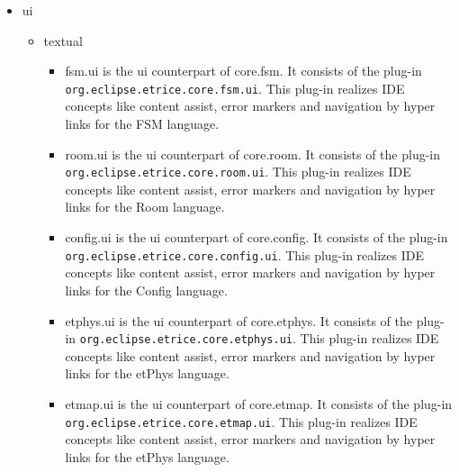 \begin{itemize}
\item ui
\begin{itemize}
\item textual
\begin{itemize}

\item fsm.ui is the ui counterpart of core.fsm.  It consists of the plug-in 
\texttt{org.eclipse.etrice.core.fsm.ui}. This plug-in realizes IDE concepts like content assist, error 
markers and navigation by hyper links for the FSM language.
\item room.ui is the ui counterpart of core.room.  It consists of the plug-in 
\texttt{org.eclipse.etrice.core.room.ui}. This plug-in realizes IDE concepts like content assist, error 
markers and navigation by hyper links for the Room language.
\item config.ui is the ui counterpart of core.config.  It consists of the plug-in 
\texttt{org.eclipse.etrice.core.config.ui}. This plug-in realizes IDE concepts like content assist, error 
markers and navigation by hyper links for the Config language.
\item etphys.ui is the ui counterpart of core.etphys.  It consists of the plug-in 
\texttt{org.eclipse.etrice.core.etphys.ui}. This plug-in realizes IDE concepts like content assist, error 
markers and navigation by hyper links for the etPhys language.
\item etmap.ui is the ui counterpart of core.etmap.  It consists of the plug-in 
\texttt{org.eclipse.etrice.core.etmap.ui}. This plug-in realizes IDE concepts like content assist, error 
markers and navigation by hyper links for the etPhys language.
\end{itemize}


\end{itemize}
\end{itemize}
